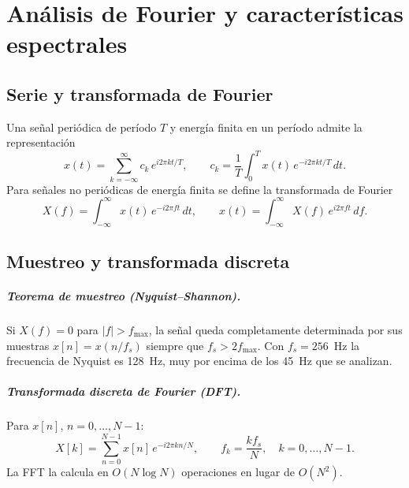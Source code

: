 \chapter{Análisis de Fourier y características espectrales}
\label{cap:fourier}

\section{Serie y transformada de Fourier}

Una señal periódica de período $T$ y energía finita en un período admite la representación
\begin{equation}
x(t) = \sum_{k=-\infty}^{\infty} c_k\, e^{i 2\pi k t / T},\qquad c_k = \frac1T\int_0^T x(t)\,e^{-i2\pi k t/T}\,dt.
\end{equation}
Para señales no periódicas de energía finita se define la transformada de Fourier
\begin{equation}
X(f) = \int_{-\infty}^{\infty} x(t)\, e^{-i 2\pi f t}\, dt, \qquad x(t) = \int_{-\infty}^{\infty} X(f)\, e^{i 2\pi f t}\, df.
\end{equation}


\section{Muestreo y transformada discreta}

\paragraph{Teorema de muestreo (Nyquist--Shannon).} Si $X(f) = 0$ para $|f| > f_{\max}$, la señal queda completamente determinada por sus muestras $x[n] = x(n/f_s)$ siempre que $f_s > 2 f_{\max}$. Con $f_s = 256$~Hz la frecuencia de Nyquist es 128~Hz, muy por encima de los 45~Hz que se analizan.

\paragraph{Transformada discreta de Fourier (DFT).} Para $x[n]$, $n=0,\dots,N-1$:
\begin{equation}
X[k] = \sum_{n=0}^{N-1} x[n]\, e^{-i 2\pi k n/N}, \qquad f_k = \frac{k f_s}{N},\quad k = 0,\dots,N-1.
\label{eq:dft}
\end{equation}
La FFT la calcula en $O(N\log N)$ operaciones en lugar de $O(N^2)$.

